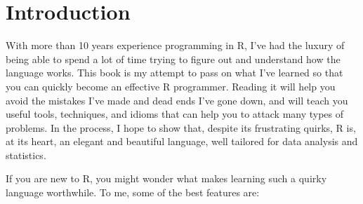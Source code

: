 \hypertarget{introduction}{%
\chapter{Introduction}\label{introduction}}

With more than 10 years experience programming in R, I've had the luxury
of being able to spend a lot of time trying to figure out and understand
how the language works. This book is my attempt to pass on what I've
learned so that you can quickly become an effective R programmer.
Reading it will help you avoid the mistakes I've made and dead ends I've
gone down, and will teach you useful tools, techniques, and idioms that
can help you to attack many types of problems. In the process, I hope to
show that, despite its frustrating quirks, R is, at its heart, an
elegant and beautiful language, well tailored for data analysis and
statistics.

If you are new to R, you might wonder what makes learning such a quirky
language worthwhile. To me, some of the best features are:


